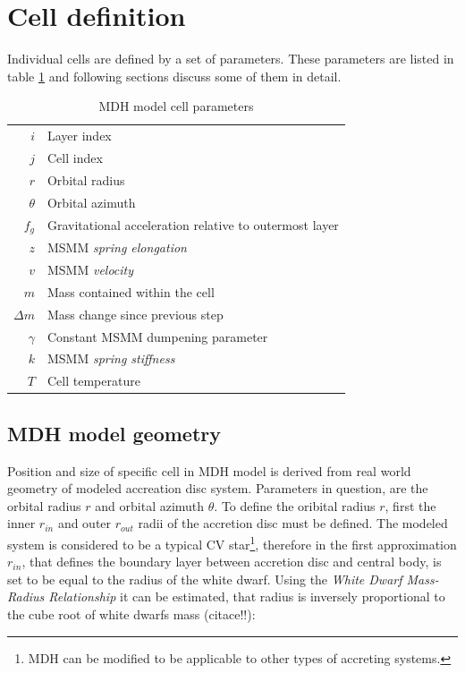 \section{Cell definition}
Individual cells are defined by a set of parameters. These parameters are listed in table \ref{table:mdh_cell_parameters} and following sections discuss some of them in detail.

\vspace{5mm}

\begin{table}[h]
\begin{center}
\begin{tabular}{r|l}
$i$			& Layer index \\
$j$			& Cell index \\
$r$			& Orbital radius \\
$\theta$	& Orbital azimuth \\ 
$f_g$		& Gravitational acceleration relative to outermost layer \\
$z$			& MSMM \emph{spring elongation}  \\
$v$			& MSMM \emph{velocity} \\
$m$			& Mass contained within the cell \\
$\Delta m$ 	& Mass change since previous step \\
$\gamma$		& Constant MSMM dumpening parameter \\
$k$			& MSMM \emph{spring stiffness} \\
$T$			& Cell temperature
\end{tabular}
\caption{MDH model cell parameters}
\label{table:mdh_cell_parameters}
\end{center}
\end{table}

\subsection{MDH model geometry}
Position and size of specific cell in MDH model is derived from real world geometry of modeled accreation disc system. Parameters in question, are the orbital radius $r$ and orbital azimuth $\theta$. To define the oribital radius $r$, first the inner $r_{in}$ and outer $r_{out}$ radii of the accretion disc must be defined. The modeled system is considered to be a typical CV star\footnote{MDH can be modified to be applicable to other types of accreting systems.}, therefore in the first approximation $r_{in}$, that defines the boundary layer between accretion disc and central body, is set to be equal to the radius of the white dwarf. Using the \emph{White Dwarf Mass-Radius Relationship} it can be estimated, that radius is inversely proportional to the cube root of white dwarfs mass (citace!!):

